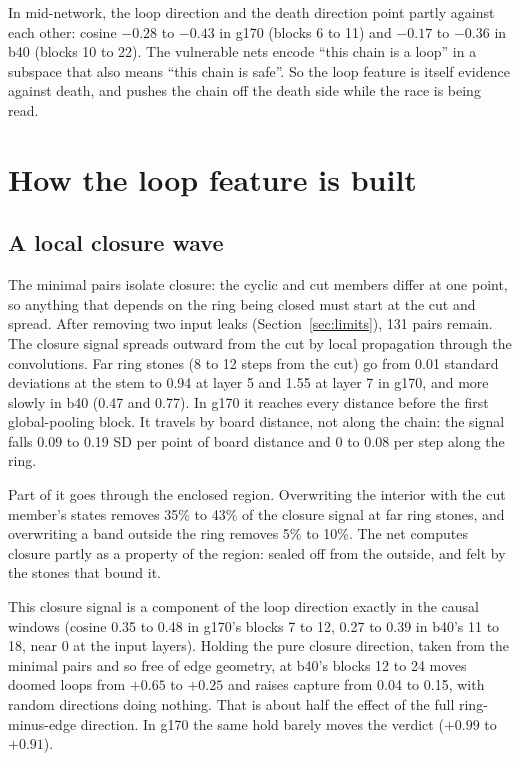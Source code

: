 \documentclass[11pt]{article}
\newcommand{\pos}[1]{$+#1$}
\newcommand{\nega}[1]{$-#1$}
\begin{document}
In mid-network, the loop direction and the death direction point partly against each other: cosine \nega{0.28} to \nega{0.43} in g170 (blocks 6 to 11) and \nega{0.17} to \nega{0.36} in b40 (blocks 10 to 22). The vulnerable nets encode ``this chain is a loop'' in a subspace that also means ``this chain is safe''. So the loop feature is itself evidence against death, and pushes the chain off the death side while the race is being read.

\section{How the loop feature is built}
\label{sec:closure}

\subsection{A local closure wave}

The minimal pairs isolate closure: the cyclic and cut members differ at one point, so anything that depends on the ring being closed must start at the cut and spread. After removing two input leaks (Section~\ref{sec:limits}), 131 pairs remain. The closure signal spreads outward from the cut by local propagation through the convolutions. Far ring stones (8 to 12 steps from the cut) go from 0.01 standard deviations at the stem to 0.94 at layer 5 and 1.55 at layer 7 in g170, and more slowly in b40 (0.47 and 0.77). In g170 it reaches every distance before the first global-pooling block. It travels by board distance, not along the chain: the signal falls 0.09 to 0.19 SD per point of board distance and 0 to 0.08 per step along the ring.

Part of it goes through the enclosed region. Overwriting the interior with the cut member's states removes 35\% to 43\% of the closure signal at far ring stones, and overwriting a band outside the ring removes 5\% to 10\%. The net computes closure partly as a property of the region: sealed off from the outside, and felt by the stones that bound it.

This closure signal is a component of the loop direction exactly in the causal windows (cosine 0.35 to 0.48 in g170's blocks 7 to 12, 0.27 to 0.39 in b40's 11 to 18, near 0 at the input layers). Holding the pure closure direction, taken from the minimal pairs and so free of edge geometry, at b40's blocks 12 to 24 moves doomed loops from \pos{0.65} to \pos{0.25} and raises capture from 0.04 to 0.15, with random directions doing nothing. That is about half the effect of the full ring-minus-edge direction. In g170 the same hold barely moves the verdict (\pos{0.99} to \pos{0.91}).
\end{document}
